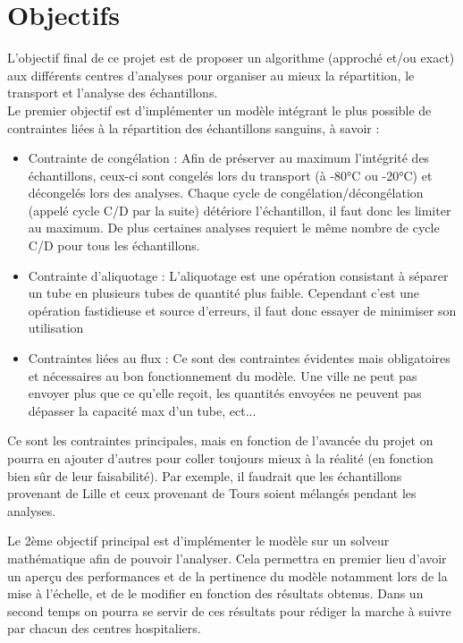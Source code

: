 \documentclass{polytech/polytech}
\numberwithin{figure}{chapter}
\begin{document}
\section{Objectifs}
L'objectif final de ce projet est de proposer un algorithme (approché et/ou exact) aux différents centres d'analyses pour organiser au mieux la répartition, le transport et l'analyse des échantillons.\\

Le premier objectif est d'implémenter un modèle intégrant le plus possible de contraintes liées à la répartition des échantillons sanguins, à savoir : 
\begin{itemize}
    \item Contrainte de congélation : Afin de préserver au maximum l'intégrité des échantillons, ceux-ci sont congelés lors du transport (à -80°C ou -20°C) et décongelés lors des analyses. Chaque cycle de congélation/décongélation (appelé cycle C/D par la suite) détériore l'échantillon, il faut donc les limiter au maximum. De plus certaines analyses requiert le même nombre de cycle C/D pour tous les échantillons.
    \item Contrainte d'aliquotage : L'\gls{aliquotage} est une opération consistant à séparer un tube en plusieurs tubes de quantité plus faible. Cependant c'est une opération fastidieuse et source d'erreurs, il faut donc essayer de minimiser son utilisation
    \item Contraintes liées au flux : Ce sont des contraintes évidentes mais obligatoires et nécessaires au bon fonctionnement du modèle. Une ville ne peut pas envoyer plus que ce qu'elle reçoit, les quantités envoyées ne peuvent pas dépasser la capacité max d'un tube, ect...\\
\end{itemize}

\begin{flushleft}
Ce sont les contraintes principales, mais en fonction de l'avancée du projet on pourra en ajouter d'autres pour coller toujours mieux à la réalité (en fonction bien sûr de leur faisabilité). Par exemple, il faudrait que les échantillons provenant de Lille et ceux provenant de Tours soient mélangés pendant les analyses.
\end{flushleft}

\begin{flushleft}
Le 2ème objectif principal est d'implémenter le modèle sur un solveur mathématique afin de pouvoir l'analyser. Cela permettra en premier lieu d'avoir un aperçu des performances et de la pertinence du modèle notamment lors de la mise à l'échelle, et de le modifier en fonction des résultats obtenus. Dans un second temps on pourra se servir de ces résultats pour rédiger la marche à suivre par chacun des centres hospitaliers.
\end{flushleft}
\end{document}
